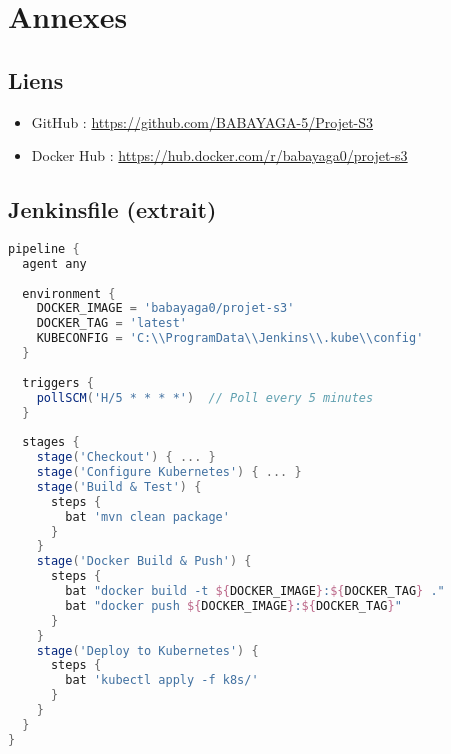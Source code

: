 \documentclass[11pt,a4paper]{article}
\begin{document}
\newpage

\section{Annexes}

\subsection{Liens}
\begin{itemize}
    \item GitHub : \url{https://github.com/BABAYAGA-5/Projet-S3}
    \item Docker Hub : \url{https://hub.docker.com/r/babayaga0/projet-s3}
\end{itemize}

\subsection{Jenkinsfile (extrait)}
\begin{lstlisting}[language=groovy]
pipeline {
  agent any
  
  environment {
    DOCKER_IMAGE = 'babayaga0/projet-s3'
    DOCKER_TAG = 'latest'
    KUBECONFIG = 'C:\\ProgramData\\Jenkins\\.kube\\config'
  }
  
  triggers {
    pollSCM('H/5 * * * *')  // Poll every 5 minutes
  }
  
  stages {
    stage('Checkout') { ... }
    stage('Configure Kubernetes') { ... }
    stage('Build & Test') {
      steps {
        bat 'mvn clean package'
      }
    }
    stage('Docker Build & Push') {
      steps {
        bat "docker build -t ${DOCKER_IMAGE}:${DOCKER_TAG} ."
        bat "docker push ${DOCKER_IMAGE}:${DOCKER_TAG}"
      }
    }
    stage('Deploy to Kubernetes') {
      steps {
        bat 'kubectl apply -f k8s/'
      }
    }
  }
}
\end{lstlisting}
\end{document}
